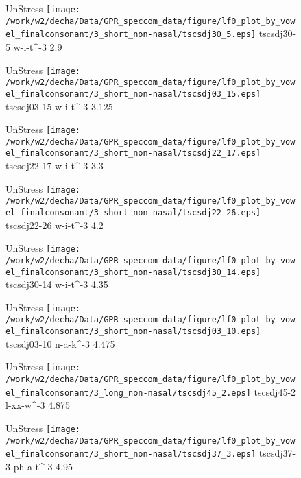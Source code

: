 \documentclass{article}
\begin{document}
\begin{figure}[t]
\begin{minipage}[b]{.24\textwidth}
UnStress
\centering
\texttt{[image: /work/w2/decha/Data/GPR\_speccom\_data/figure/lf0\_plot\_by\_vowel\_finalconsonant/3\_short\_non-nasal/tscsdj30\_5.eps]}
tscsdj30-5 w-i-t\textasciicircum-3 2.9
\end{minipage}
\begin{minipage}[b]{.24\textwidth}
UnStress
\centering
\texttt{[image: /work/w2/decha/Data/GPR\_speccom\_data/figure/lf0\_plot\_by\_vowel\_finalconsonant/3\_short\_non-nasal/tscsdj03\_15.eps]}
tscsdj03-15 w-i-t\textasciicircum-3 3.125
\end{minipage}
\begin{minipage}[b]{.24\textwidth}
UnStress
\centering
\texttt{[image: /work/w2/decha/Data/GPR\_speccom\_data/figure/lf0\_plot\_by\_vowel\_finalconsonant/3\_short\_non-nasal/tscsdj22\_17.eps]}
tscsdj22-17 w-i-t\textasciicircum-3 3.3
\end{minipage}
\begin{minipage}[b]{.24\textwidth}
UnStress
\centering
\texttt{[image: /work/w2/decha/Data/GPR\_speccom\_data/figure/lf0\_plot\_by\_vowel\_finalconsonant/3\_short\_non-nasal/tscsdj22\_26.eps]}
tscsdj22-26 w-i-t\textasciicircum-3 4.2
\end{minipage}
\end{figure}

\begin{figure}[t]
\begin{minipage}[b]{.24\textwidth}
UnStress
\centering
\texttt{[image: /work/w2/decha/Data/GPR\_speccom\_data/figure/lf0\_plot\_by\_vowel\_finalconsonant/3\_short\_non-nasal/tscsdj30\_14.eps]}
tscsdj30-14 w-i-t\textasciicircum-3 4.35
\end{minipage}
\begin{minipage}[b]{.24\textwidth}
UnStress
\centering
\texttt{[image: /work/w2/decha/Data/GPR\_speccom\_data/figure/lf0\_plot\_by\_vowel\_finalconsonant/3\_short\_non-nasal/tscsdj03\_10.eps]}
tscsdj03-10 n-a-k\textasciicircum-3 4.475
\end{minipage}
\begin{minipage}[b]{.24\textwidth}
UnStress
\centering
\texttt{[image: /work/w2/decha/Data/GPR\_speccom\_data/figure/lf0\_plot\_by\_vowel\_finalconsonant/3\_long\_non-nasal/tscsdj45\_2.eps]}
tscsdj45-2 l-xx-w\textasciicircum-3 4.875
\end{minipage}
\begin{minipage}[b]{.24\textwidth}
UnStress
\centering
\texttt{[image: /work/w2/decha/Data/GPR\_speccom\_data/figure/lf0\_plot\_by\_vowel\_finalconsonant/3\_short\_non-nasal/tscsdj37\_3.eps]}
tscsdj37-3 ph-a-t\textasciicircum-3 4.95
\end{minipage}
\end{figure}
\end{document}
